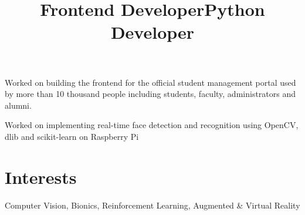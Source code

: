 \documentclass[margin]{res}
\begin{document}
\begin{resume}
      \title{\textbf{Frontend Developer}}
      \begin{position}
        Worked on building the frontend for the official student management portal used by more than 10 thousand people including students, faculty, administrators and alumni.
      \end{position}

      \title{\textbf{Python Developer}}
      \begin{position}
        Worked on implementing real-time face detection and recognition using OpenCV, dlib and scikit-learn on Raspberry Pi
      \end{position}

    \section{Interests}
      Computer Vision, Bionics, Reinforcement Learning, Augmented \& Virtual Reality
  \end{resume}
\end{document}
